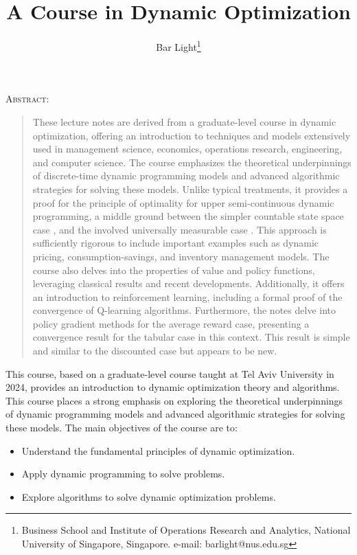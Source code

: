 \documentclass[letter,11pt]{article}
\begin{document}
\title{A Course in Dynamic Optimization}
\author{Bar Light\protect\thanks{Business School and Institute of Operations Research and Analytics, National University of Singapore, Singapore. e-mail: \textsf{barlight@nus.edu.sg} }}  
\maketitle




\noindent \noindent \textsc{Abstract}:
\begin{quote}
	

These lecture notes are derived from a graduate-level course in dynamic optimization, offering an introduction to techniques and models extensively used in management science, economics, operations research, engineering, and computer science. The course emphasizes the theoretical underpinnings of discrete-time dynamic programming models and advanced algorithmic strategies for solving these models. Unlike typical treatments, it provides a proof for the principle of optimality for upper semi-continuous dynamic programming, a middle ground between the  simpler countable state space  case \cite{bertsekas2012dynamic}, and the involved universally measurable case \cite{bertsekas1996stochastic}. This approach is sufficiently rigorous to include important examples such as dynamic pricing, consumption-savings, and inventory management models. The course also delves into the properties of value and policy functions, leveraging classical results \cite{topkis1998supermodularity} and recent developments. Additionally, it offers an introduction to reinforcement learning, including a formal proof of the convergence of Q-learning algorithms. Furthermore, the notes delve into policy gradient methods for the average reward case, presenting a convergence result for the tabular case in this context. This result is simple and similar to the discounted case but appears to be new.

		 
\end{quote}

\newpage
This course, based  on a graduate-level course taught at Tel Aviv University in 2024, provides an introduction to dynamic optimization theory and algorithms. 
This course places a strong emphasis on exploring the theoretical underpinnings of dynamic programming models and advanced algorithmic strategies for solving these models. The main objectives of the course are to:
\begin{itemize}
    \item Understand the fundamental principles of dynamic optimization.
    \item Apply dynamic programming to solve problems.
    \item Explore algorithms to solve dynamic optimization problems.
\end{itemize}
\end{document}
